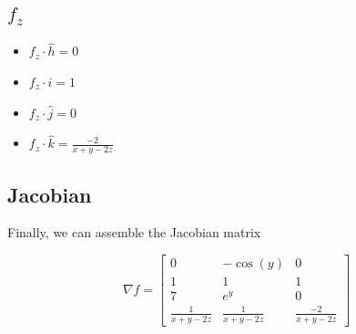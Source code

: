 \documentclass[letterpaper]{article}
\begin{document}
\subsection{\(f_z\)}
\label{sec:orga8f7139}
\begin{itemize}
\item \(f_z \cdot {\hat{h}} = 0\)
\item \(f_z \cdot {\hat{i}} = 1\)
\item \(f_z \cdot {\hat{j}} = 0\)
\item \(f_z \cdot {\hat{k}} = \frac{-2}{x+y-2z}\)
\end{itemize}

\subsection{Jacobian}
\label{sec:orgf596c6e}
Finally, we can assemble the Jacobian matrix

\begin{equation}
   \nabla f = \begin{bmatrix} 
0 & -\cos(y) & 0  \\
1 & 1 & 1 \\
7 & e^y & 0 \\
\frac{1}{x+y-2z} & \frac{1}{x+y-2z} & \frac{-2}{x+y-2z}
   \end{bmatrix} 
\end{equation}
\end{document}

